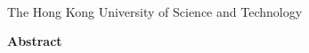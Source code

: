 \begin{center}
{\Large \thesistitle}\\
\vspace{20mm}
\thesisauthor\\
\departmentname\\
The Hong Kong University of Science and Technology
\end{center}
\vspace{8mm}
\begin{center}
\textbf{Abstract}
\end{center}
\par
\noindent


